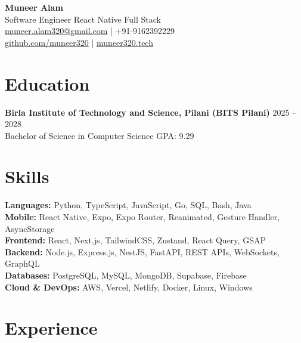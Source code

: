 \documentclass[a4paper,10pt]{article}
\begin{document}
\begin{center}
    {\LARGE \textbf{Muneer Alam}} \\[2pt]
    {\normalsize Software Engineer \textbar{} React Native \textbar{} Full Stack} \\[4pt]
    \href{mailto:muneer.alam320@gmail.com}{muneer.alam320@gmail.com} \quad | \quad
    +91-9162392229 \\
    \href{https://github.com/muneer320}{github.com/muneer320} \quad | \quad
    \href{https://muneer320.tech}{muneer320.tech}
\end{center}

\vspace{1mm}

\section*{Education}

\textbf{Birla Institute of Technology and Science, Pilani (BITS Pilani)} \hfill 2025 -- 2028 \\
Bachelor of Science in Computer Science \hfill GPA: 9.29

\vspace{1mm}

\section*{Skills}

\textbf{Languages:} Python, TypeScript, JavaScript, Go, SQL, Bash, Java \\
\textbf{Mobile:} React Native, Expo, Expo Router, Reanimated, Gesture Handler, AsyncStorage \\
\textbf{Frontend:} React, Next.js, TailwindCSS, Zustand, React Query, GSAP \\
\textbf{Backend:} Node.js, Express.js, NestJS, FastAPI, REST APIs, WebSockets, GraphQL \\
\textbf{Databases:} PostgreSQL, MySQL, MongoDB, Supabase, Firebase \\
\textbf{Cloud \& DevOps:} AWS, Vercel, Netlify, Docker, Linux, Windows

\vspace{1mm}

\section*{Experience}
\end{document}
